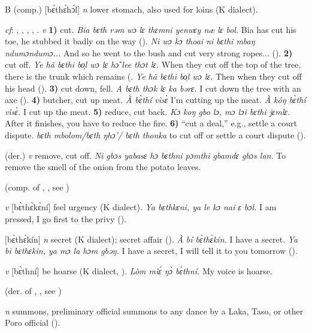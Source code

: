 \begin{letter}{B}
 (comp.) [bɛ́thɛ́hɔ́l] \textit{n} lower stomach, also used for loins (K dialect).

 \textit{cf}: , , , , . \textit{v} \textbf{1)} cut. \textit{Bia bɛth rəm wɔ lɛ thɛmni yenwɛy næ lɛ bol.} Bia has cut his toe, he stubbed it badly on the way (\citealt{Pichl1967}). \textit{Ni wɔ kɔ thoai ni bɛthi mbaŋ ndumɔndumɔ...} And so he went to the bush and cut very strong ropes... (\citealt{Sumner1921}). \textbf{2)} cut off. \textit{Ye hã bɛthi bo̹l wɔ lɛ hɔ̃ lee thɔt lɛ.} When they cut off the top of the tree, there is the trunk which remains (\citealt{Pichl1967}. \textit{Ye hã bɛthi bo̹l wɔ lɛ.} Then when they cut off his head (\citealt{Pichl1967}). \textbf{3)} cut down, fell. \textit{A bɛth thɔk lɛ ka bərɛ.} I cut down the tree with an axe (\citealt{Pichl1967}). \textbf{4)} butcher, cut up meat. \textit{À bɛ̀thí vìsɛ̀} I'm cutting up the meat. \textit{À kóŋ bɛ̀thí vìsɛ̀.} I cut up the meat. \textbf{5)} reduce, cut back. \textit{Kɔ koŋ gbo lɔ, mɔ lɔi bɛthi jɛmlɛ.} After it finishes, you have to reduce the fire. \textbf{6)} “cut a deal,” e.g., settle a court dispute. \textit{bɛth mbolom/bɛth ŋhɔ'/ bɛth thonka} to cut off or settle a court dispute (\citealt{Pichl1967}).

 (der.) \textit{v} remove, cut off. \textit{Ni gbɔs yabasɛ hɔ bɛthni pɔmthi gbamdɛ gbɔs lan.} To remove the smell of the onion from the potato leaves.

 (comp. of , , see ) 

 \textit{v} [bɛ̀thɛ̀kɛ̀ní] feel urgency (K dialect). \textit{Ya bɛthkɛni, ya le kɔ nai ɛ bɔl.} I am pressed, I go first to the privy (\citealt{Pichl1967}). 

 [bɛ̀thɛ̀kín] \textit{n} secret (K dialect); secret affair (\citealt{Pichl1967}). \textit{À bí bɛ̀thɛ̀kín.} I have a secret. \textit{Ya bi bɛthɛkin, ya mɔ la hɔm gbəŋ.} I have a secret, I will tell it to you tomorrow (\citealt{Pichl1967}). 

 \textit{v} [bɛ̀thní] be hoarse (K dialect, \citealt{Pichl1967}). \textit{Lòm mìɛ́ ŋɔ̀ bɛ̀thní.} My voice is hoarse.

 (der. of , , see ) 

 \textit{n} summons, preliminary official summons to any dance by a Laka, Taso, or other Poro official (\citealt{Pichl1967}). 


\end{letter}
